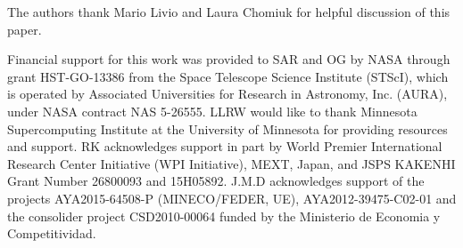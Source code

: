 
\begin{acknowledgments}
The authors thank Mario Livio and Laura Chomiuk for helpful discussion
of this paper.

Financial support for this work was provided to SAR and OG by NASA
through grant HST-GO-13386 from the Space Telescope Science Institute
(STScI), which is operated by Associated Universities for Research in
Astronomy, Inc. (AURA), under NASA contract NAS 5-26555. LLRW would
like to thank Minnesota Supercomputing Institute at the University of
Minnesota for providing resources and support.
RK acknowledges support in part by World Premier International
Research Center Initiative (WPI Initiative), MEXT, Japan, and JSPS
KAKENHI Grant Number 26800093 and 15H05892.
J.M.D acknowledges support of the projects AYA2015-64508-P
(MINECO/FEDER, UE), AYA2012-39475-C02-01 and the consolider project
CSD2010-00064 funded by the Ministerio de Economia y Competitividad.

\end{acknowledgments}
